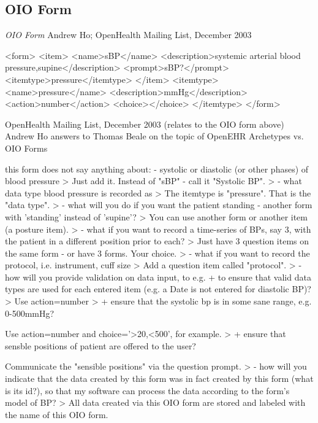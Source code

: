 %
%
%
%
%
%
%

\subsection{OIO Form}
\label{oio_form_heading}

\emph{OIO Form}
Andrew Ho; OpenHealth Mailing List, December 2003 \cite{openhealth}

<form>
<item>
  <name>sBP</name>
  <description>systemic arterial blood pressure,supine</description>
  <prompt>sBP?</prompt>
  <itemtype>pressure</itemtype>
</item>
<itemtype>
  <name>pressure</name>
  <description>mmHg</description>
  <action>number</action>
  <choice></choice>
</itemtype>
</form>

OpenHealth Mailing List, December 2003 (relates to the OIO form above) \cite{openhealth}
Andrew Ho answers to Thomas Beale on the topic of OpenEHR Archetypes vs. OIO Forms

this form does not say anything about:
- systolic or diastolic (or other phases) of blood pressure
>
Just add it. Instead of "sBP" - call it "Systolic BP".
>
- what data type blood pressure is recorded as
>
The itemtype is "pressure". That is the "data type".
>
- what will you do if you want the patient standing - another form with
'standing' instead of 'supine'?
>
You can use another form or another item (a posture item).
>
- what if you want to record a time-series of BPs, say 3, with the patient
in a different position prior to each?
>
Just have 3 question items on the same form - or have 3 forms. Your choice.
>
- what if you want to record the protocol, i.e. instrument, cuff size
>
Add a question item called "protocol".
>
- how will you provide validation on data input, to e.g.
+ to ensure that
valid data types are used for each entered item (e.g. a Date is not entered
for diastolic BP)?
>
Use action=number
>
+ ensure that the systolic bp is in some sane range, e.g. 0-500mmHg?

Use action=number and choice='>20,<500', for example.
>
+ ensure that sensble positions of patient are offered to the user?

Communicate the "sensible positions" via the question prompt.
>
- how will you indicate that the data created by this form was in fact
created by this form (what is its id?), so that my software can process
the data according to the form's model of BP?
>
All data created via this OIO form are stored and labeled with the name of
this OIO form.
